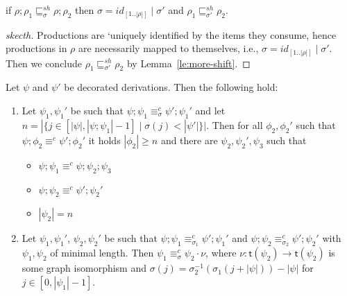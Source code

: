 \documentclass{llncs}
\newcommand{\interval}[2][1]{\ensuremath{[{#1},{#2}]}}
\newcommand{\perm}{\sigma}
\newcommand{\target}[1]{\ensuremath{\mathsf{t}({#1})}}
\newcommand{\shiftpre}[1][]{\ensuremath{\mathrel{{\sqsubseteq}^{\mathit{sh}}_{#1}}}}
\begin{document}
\begin{lemma}
  if $\rho;\rho_1 \shiftpre[\perm] \rho; \rho_2$ then
  $\perm = id_{[1..|\rho|]} \mid \perm'$ and
  $\rho_1 \shiftpre[\perm'] \rho_2$.
\end{lemma}

\begin{proof}[skecth]
  Productions are `uniquely identified by the items they consume,
  hence productions in $\rho$ are necessarily mapped to themselves,
  i.e., $\perm = id_{[1..|\rho|]} \mid \perm'$. Then we conclude
  $\rho_1 \shiftpre[\perm'] \rho_2$ by Lemma~\ref{le:more-shift}.
\end{proof}


\begin{lemma}
  \label{le:prop-c}
  Let $\psi$ and $\psi'$ be decorated derivations. Then the following hold:
  \begin{enumerate}
  \item
    \label{le:prop-c:1}
    Let $\psi_1, \psi_1'$ be such
    that $\psi;\psi_1 \equiv^c_{\perm} \psi';\psi_1'$ and let
    $n = | \{ j \in \interval[|\psi|]{|\psi;\psi_1|-1} \mid \perm(j)
    < |\psi'| \}|$. Then for all $\phi_2, \phi_2'$ such that
    $\psi;\phi_2 \equiv^c \psi';\phi_2'$ it holds $|\phi_2| \geq n$
    and there are $\psi_2, \psi_2',\psi_3$ such that

    \begin{itemize}
    \item $\psi;\psi_1 \equiv^c \psi;\psi_2;\psi_3$
    \item $\psi;\psi_2 \equiv^c \psi';\psi_2'$
      
    \item $|\psi_2| = n$
    
    \end{itemize}

  \item
    \label{le:prop-c:2}
    Let $\psi_1, \psi_1'$, $\psi_2, \psi_2'$ be such that
    $\psi;\psi_1 \equiv^c_{\perm_1} \psi';\psi_1'$ and
    $\psi;\psi_2 \equiv^c_{\perm_2} \psi';\psi_2'$ with $\psi_1, \psi_2$
    of minimal length. Then $\psi_1 \equiv^c_\perm \psi_2 \cdot \nu$,
    where $\nu : \target{\psi_2} \to \target{\psi_2}$ is some graph isomorphism and
    $\perm(j) = \perm_2^{-1}(\perm_1(j + |\psi|))-|\psi|$ for
    $j \in \interval[0]{|\psi_1|-1}$.    
  \end{enumerate}
\end{lemma}
\end{document}
